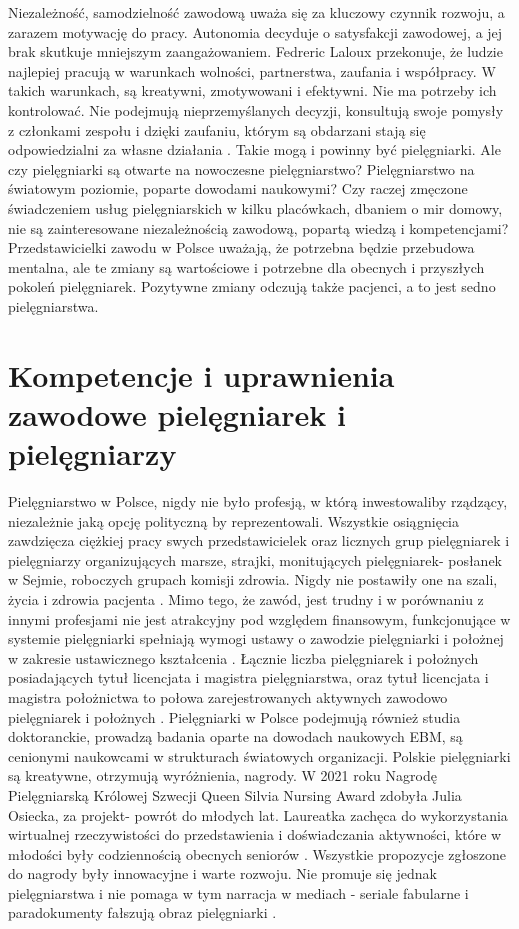 \documentclass[a4paper,12pt,twoside,openright]{mwrep}
\begin{document}
Niezależność, samodzielność zawodową uważa się za kluczowy czynnik rozwoju, a zarazem motywację do pracy. Autonomia decyduje o satysfakcji zawodowej, a jej brak skutkuje mniejszym zaangażowaniem. Fedreric Laloux przekonuje, że ludzie najlepiej pracują w warunkach wolności, partnerstwa, zaufania i współpracy. W takich warunkach, są kreatywni, zmotywowani i efektywni. Nie ma potrzeby ich kontrolować. Nie podejmują nieprzemyślanych decyzji, konsultują swoje pomysły z członkami zespołu i dzięki zaufaniu, którym są obdarzani stają się odpowiedzialni za własne działania \cite{federic}. Takie mogą i powinny być pielęgniarki. Ale czy pielęgniarki są otwarte na nowoczesne pielęgniarstwo? Pielęgniarstwo na światowym poziomie, poparte dowodami naukowymi? Czy raczej zmęczone świadczeniem usług pielęgniarskich w kilku placówkach, dbaniem o mir domowy, nie są zainteresowane niezależnością zawodową, popartą wiedzą i kompetencjami? Przedstawicielki zawodu w Polsce uważają, że potrzebna będzie przebudowa mentalna, ale te zmiany są wartościowe i potrzebne dla obecnych i przyszłych pokoleń pielęgniarek. Pozytywne zmiany odczują także pacjenci, a to jest sedno pielęgniarstwa.

\section{Kompetencje i uprawnienia zawodowe \newline pielęgniarek i pielęgniarzy}
Pielęgniarstwo w Polsce, nigdy nie było profesją, w którą inwestowaliby rządzący, niezależnie jaką opcję polityczną by reprezentowali. Wszystkie osiągnięcia zawdzięcza ciężkiej pracy swych przedstawicielek oraz licznych grup pielęgniarek i pielęgniarzy organizujących marsze, strajki, monitujących pielęgniarek- posłanek w Sejmie, roboczych grupach komisji zdrowia. Nigdy nie postawiły one na szali, życia i zdrowia pacjenta \cite{strajk}. Mimo tego, że zawód, jest trudny i w porównaniu z innymi profesjami nie jest atrakcyjny pod względem finansowym, funkcjonujące w systemie pielęgniarki spełniają wymogi ustawy o zawodzie pielęgniarki i położnej  w zakresie ustawicznego kształcenia \cite{2011}. Łącznie liczba pielęgniarek i położnych posiadających tytuł licencjata i magistra pielęgniarstwa, oraz tytuł licencjata i magistra położnictwa to połowa zarejestrowanych aktywnych zawodowo pielęgniarek i położnych \cite{ile}. Pielęgniarki w Polsce podejmują również studia doktoranckie, prowadzą badania oparte na dowodach naukowych EBM, są cenionymi naukowcami w strukturach światowych organizacji. Polskie pielęgniarki są kreatywne, otrzymują wyróżnienia, nagrody. W 2021 roku Nagrodę Pielęgniarską Królowej Szwecji Queen Silvia Nursing Award zdobyła Julia Osiecka, za projekt- powrót do młodych lat. Laureatka zachęca do wykorzystania wirtualnej rzeczywistości do przedstawienia i doświadczania aktywności, które w młodości były codziennością obecnych seniorów \cite{julia}. Wszystkie propozycje zgłoszone do nagrody były innowacyjne i warte rozwoju. Nie promuje się jednak  pielęgniarstwa i nie pomaga w tym narracja w mediach - seriale fabularne i paradokumenty fałszują obraz pielęgniarki \cite{postrzeganie}.
\end{document}
